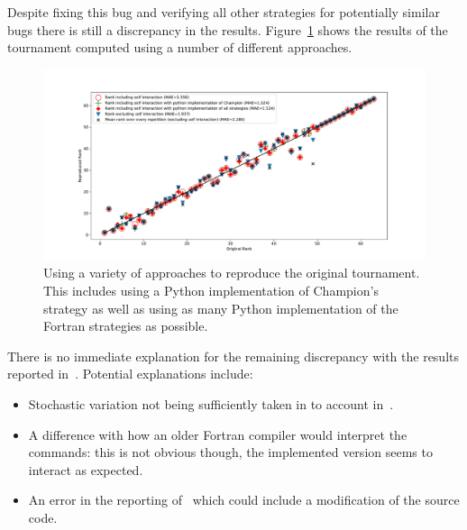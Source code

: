 \documentclass{article}
\begin{document}
Despite fixing this bug and verifying all other strategies for potentially
similar bugs there is still a discrepancy in the results. 
Figure~\ref{fig:original_tournament_rankings_all_approaches} shows
the results of the tournament computed using a number of different approaches.

\begin{figure}[!hbtp]
    \begin{center}
        \includegraphics[width=.95\textwidth]{assets/original_tournament_rankings_all_approaches.pdf}
        \caption{Using a variety of approaches to reproduce the original
        tournament. This includes using a Python implementation of Champion's
        strategy as well as using as many Python implementation of the Fortran
        strategies as possible.}
        \label{fig:original_tournament_rankings_all_approaches}
    \end{center}
\end{figure}

There is no immediate explanation for the remaining discrepancy with the results
reported 
in~\cite{Axelrod1980b}. Potential explanations include:

\begin{itemize}
    \item Stochastic variation not being sufficiently taken in to account
        in~\cite{Axelrod1980b}.
    \item A difference with how an older Fortran compiler would interpret the
        commands: this is not obvious though, the implemented version seems to
        interact as expected.
    \item An error in the reporting of~\cite{Axelrod1980b} which could include
        a modification of the source code.
\end{itemize}
\end{document}
